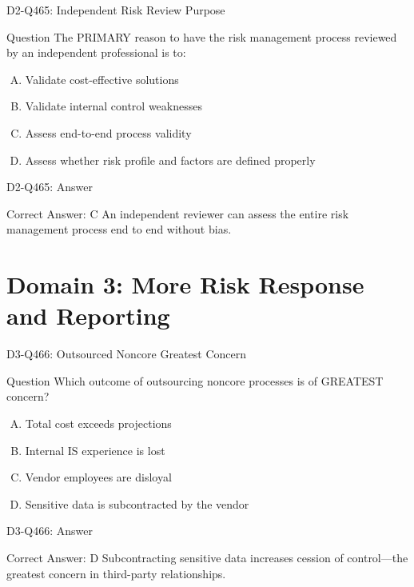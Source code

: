 \documentclass{beamer}
\begin{document}
\begin{frame}{D2-Q465: Independent Risk Review Purpose}
	\begin{block}{Question}
		The PRIMARY reason to have the risk management process reviewed by an independent professional is to:
	\end{block}
	\begin{enumerate}[(A)]
		\item Validate cost-effective solutions
		\item Validate internal control weaknesses
		\item Assess end-to-end process validity
		\item Assess whether risk profile and factors are defined properly
	\end{enumerate}
\end{frame}
\begin{frame}{D2-Q465: Answer}
	\begin{block}{Correct Answer: C}
		An independent reviewer can assess the entire risk management process end to end without bias.
	\end{block}
\end{frame}

\section{Domain 3: More Risk Response and Reporting}

\begin{frame}{D3-Q466: Outsourced Noncore Greatest Concern}
	\begin{block}{Question}
		Which outcome of outsourcing noncore processes is of GREATEST concern?
	\end{block}
	\begin{enumerate}[(A)]
		\item Total cost exceeds projections
		\item Internal IS experience is lost
		\item Vendor employees are disloyal
		\item Sensitive data is subcontracted by the vendor
	\end{enumerate}
\end{frame}
\begin{frame}{D3-Q466: Answer}
	\begin{block}{Correct Answer: D}
		Subcontracting sensitive data increases cession of control—the greatest concern in third-party relationships.
	\end{block}
\end{frame}
\end{document}

